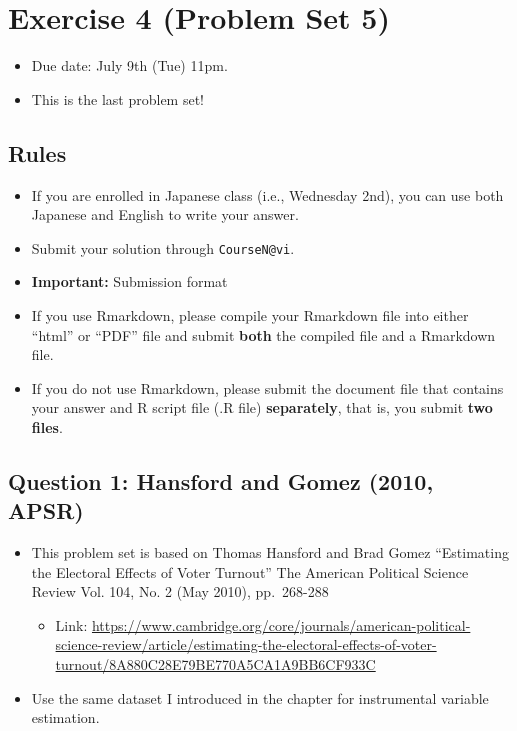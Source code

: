 \documentclass[]{book}
\providecommand{\tightlist}{%
  \setlength{\itemsep}{0pt}\setlength{\parskip}{0pt}}
\begin{document}
\chapter{Exercise 4 (Problem Set 5)}\label{exercise-4-problem-set-5}

\begin{itemize}
\tightlist
\item
  Due date: July 9th (Tue) 11pm.
\item
  This is the last problem set!
\end{itemize}

\section{Rules}\label{rules-2}

\begin{itemize}
\tightlist
\item
  If you are enrolled in Japanese class (i.e., Wednesday 2nd), you can
  use both Japanese and English to write your answer.
\item
  Submit your solution through \texttt{CourseN@vi}.
\item
  \textbf{Important:} Submission format
\item
  If you use Rmarkdown, please compile your Rmarkdown file into either
  ``html'' or ``PDF'' file and submit \textbf{both} the compiled file
  and a Rmarkdown file.
\item
  If you do not use Rmarkdown, please submit the document file that
  contains your answer and R script file (.R file) \textbf{separately},
  that is, you submit \textbf{two files}.
\end{itemize}

\section{Question 1: Hansford and Gomez (2010,
APSR)}\label{question-1-hansford-and-gomez-2010-apsr}

\begin{itemize}
\tightlist
\item
  This problem set is based on Thomas Hansford and Brad Gomez
  ``Estimating the Electoral Effects of Voter Turnout'' The American
  Political Science Review Vol. 104, No. 2 (May 2010), pp.~268-288

  \begin{itemize}
  \tightlist
  \item
    Link:
    \url{https://www.cambridge.org/core/journals/american-political-science-review/article/estimating-the-electoral-effects-of-voter-turnout/8A880C28E79BE770A5CA1A9BB6CF933C}
  \end{itemize}
\item
  Use the same dataset I introduced in the chapter for instrumental
  variable estimation.
\end{itemize}
\end{document}
